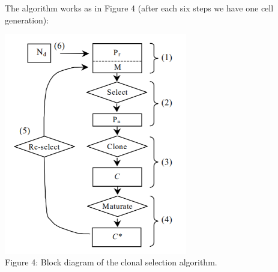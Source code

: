 \documentclass{article}
\begin{document}
The algorithm works as in Figure 4 (after each six steps we have one cell generation):

\begin{center} 
\includegraphics[width=8cm,clip]{images/cj_block_diagram_CSA.png}\\
\caption{Figure 4: Block diagram of the clonal selection algorithm.}	
\end{center} 
\end{document}
